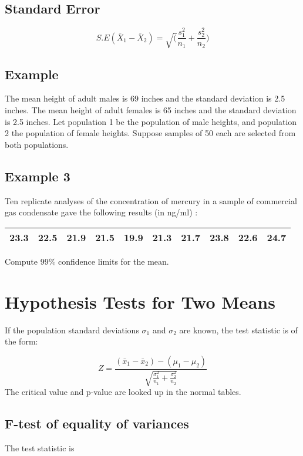 \subsection{Standard Error}

\begin{equation}
S.E(\bar{X}_{1}-\bar{X}_{2}) =
\sqrt(\frac{s^2_{1}}{n_{1}}+\frac{s^2_{2}}{n_{2}})
\end{equation}

\subsection{Example}
The mean height of adult males is 69 inches and the standard
deviation is 2.5 inches. The mean height of adult females is 65
inches and the standard deviation is 2.5 inches. Let population 1
be the population of male heights, and population 2 the population
of female heights. Suppose samples of 50 each are selected from
both populations.



\subsection{Example 3} Ten replicate analyses of the concentration
of mercury in a sample of commercial gas condensate gave the
following results (in ng/ml) :

\begin{tabular}{|c|c|c|c|c|c|c|c|c|c|}
  \hline
23.3 & 22.5 & 21.9 & 21.5 & 19.9 & 21.3 & 21.7 & 23.8 & 22.6 &
24.7\\
  \hline
\end{tabular}

Compute 99\% confidence limits for the mean.
\section{Hypothesis Tests for Two Means}

If the population standard deviations $\sigma_1$ and $\sigma_2$
are known, the test statistic is of the form:

\begin{equation}
Z = \frac{(\bar{x}_1 - \bar{x}_2) - (\mu_1 - \mu_2 ) }{\sqrt{
\frac{\sigma^2_1}{n_1}+\frac{\sigma^2_2}{n_2}} }
\end{equation}
The critical value and p-value are looked up in the normal tables.






\subsection{F-test of equality of variances}
The test statistic is

